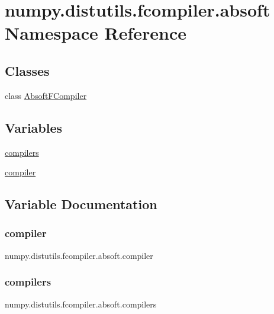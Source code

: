 \hypertarget{namespacenumpy_1_1distutils_1_1fcompiler_1_1absoft}{}\section{numpy.\+distutils.\+fcompiler.\+absoft Namespace Reference}
\label{namespacenumpy_1_1distutils_1_1fcompiler_1_1absoft}
\subsection*{Classes}
\begin{DoxyCompactItemize}
\item 
class \hyperlink{classnumpy_1_1distutils_1_1fcompiler_1_1absoft_1_1AbsoftFCompiler}{Absoft\+F\+Compiler}
\end{DoxyCompactItemize}
\subsection*{Variables}
\begin{DoxyCompactItemize}
\item 
\hyperlink{namespacenumpy_1_1distutils_1_1fcompiler_1_1absoft_aed9d2d2975b8a67641c9b8deb443ba32}{compilers}
\item 
\hyperlink{namespacenumpy_1_1distutils_1_1fcompiler_1_1absoft_a378b0ec1c4df412b3fb64dec9caa7728}{compiler}
\end{DoxyCompactItemize}


\subsection{Variable Documentation}
\mbox{\label{namespacenumpy_1_1distutils_1_1fcompiler_1_1absoft_a378b0ec1c4df412b3fb64dec9caa7728}} 
\subsubsection{\texorpdfstring{compiler}{compiler}}
{\footnotesize\ttfamily numpy.\+distutils.\+fcompiler.\+absoft.\+compiler}

\mbox{\label{namespacenumpy_1_1distutils_1_1fcompiler_1_1absoft_aed9d2d2975b8a67641c9b8deb443ba32}} 
\subsubsection{\texorpdfstring{compilers}{compilers}}
{\footnotesize\ttfamily numpy.\+distutils.\+fcompiler.\+absoft.\+compilers}

